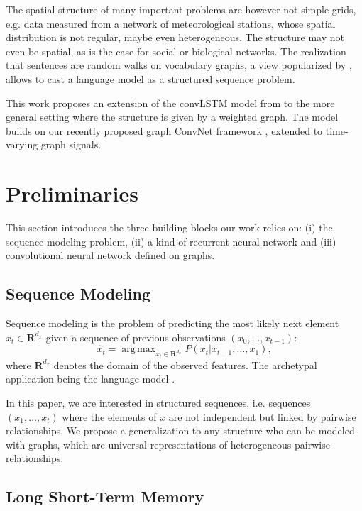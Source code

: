 \documentclass{article} %
\DeclareMathOperator*{\argmax}{arg\,max}
\begin{document}
The spatial structure of many important problems are however not simple grids,
e.g. data measured from a network of meteorological stations, whose spatial
distribution is not regular, maybe even heterogeneous. The structure may not
even be spatial, as is the case for social or biological networks. The
realization that sentences are random walks on vocabulary graphs, a view
popularized by \cite{word2vec}, allows to cast a language model as a structured
sequence problem.

This work proposes an extension of the convLSTM model from \cite{convlstm} to
the more general setting where the structure is given by a weighted graph.  The
model builds on our recently proposed graph ConvNet framework \citep{graphcnn},
extended to time-varying graph signals.


\section{Preliminaries}

This section introduces the three building blocks our work relies on: (i) the
sequence modeling problem, (ii) a kind of recurrent neural network and (iii)
convolutional neural network defined on graphs.

\subsection{Sequence Modeling}

Sequence modeling is the problem of predicting the most likely next element
$\hat{x}_t \in \mathbf{R}^{d_x}$ given a sequence of previous observations
$(x_0, \ldots, x_{t-1})$:
\begin{equation} \label{eqn:seq}
	\hat{x}_t = \argmax_{x_t \in \mathbf{R}^{d_x}} P(x_t | x_{t-1}, \ldots, x_1),
\end{equation}
where $\mathbf{R}^{d_x}$ denotes the domain of the observed features. The
archetypal application being the language model \citep{seq_graves}.

In this paper, we are interested in structured sequences, i.e. sequences $(x_1,
\ldots, x_t)$ where the elements of $x$ are not independent but linked by
pairwise relationships. We propose a generalization to any structure who can be
modeled with graphs, which are universal representations of heterogeneous
pairwise relationships.

\subsection{Long Short-Term Memory}
\end{document}
